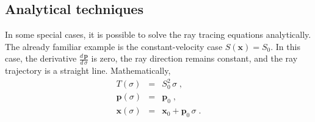 \subsection{Analytical techniques}


In some special cases, it is possible to solve the ray tracing
equations analytically. The already familiar example is the
constant-velocity case $S(\mathbf{x}) = S_0$. In this case, the
derivative $\frac{d\,\mathbf{p}}{d\,\sigma}$ is zero, the ray
direction remains constant, and the ray trajectory is a straight
line. Mathematically,
\begin{eqnarray}
  \label{eq:tconst}
  T(\sigma) & = & S_0^2\,\sigma\;, \\
  \label{eq:pconst}
  \mathbf{p}(\sigma) & = & \mathbf{p}_0\;, \\
  \label{eq:xconst}
  \mathbf{x}(\sigma) & = & 
  \mathbf{x}_0 + \mathbf{p}_0\,\sigma\;.
\end{eqnarray}


